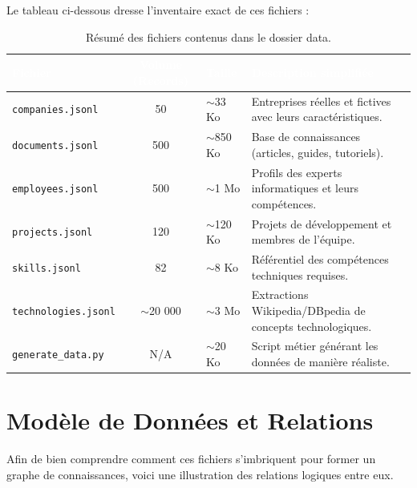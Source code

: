 \documentclass[12pt,a4paper]{article}
\begin{document}
Le tableau ci-dessous dresse l'inventaire exact de ces fichiers :

\begin{table}[h!]
    \centering
    \renewcommand{\arraystretch}{1.5}
    \begin{tabularx}{\textwidth}{>{\columncolor{bglight}}l c l X}
        \toprule
        \rowcolor{primary}
        \textcolor{white}{\textbf{Fichier}} & \textcolor{white}{\textbf{Volume (Records)}} & \textcolor{white}{\textbf{Taille}} & \textcolor{white}{\textbf{Description simplifiée}} \\
        \midrule
        \texttt{companies.jsonl} & 50 & $\sim$33 Ko & Entreprises réelles et fictives avec leurs caractéristiques. \\
        \texttt{documents.jsonl} & 500 & $\sim$850 Ko & Base de connaissances (articles, guides, tutoriels). \\
        \texttt{employees.jsonl} & 500 & $\sim$1 Mo & Profils des experts informatiques et leurs compétences. \\
        \texttt{projects.jsonl} & 120 & $\sim$120 Ko & Projets de développement et membres de l'équipe. \\
        \texttt{skills.jsonl} & 82 & $\sim$8 Ko & Référentiel des compétences techniques requises. \\
        \texttt{technologies.jsonl}& $\sim$20 000 & $\sim$3 Mo & Extractions Wikipedia/DBpedia de concepts technologiques. \\
        \texttt{generate\_data.py} & N/A & $\sim$20 Ko & Script métier générant les données de manière réaliste. \\
        \bottomrule
    \end{tabularx}
    \caption{Résumé des fichiers contenus dans le dossier data.}
\end{table}

\section{Modèle de Données et Relations}

Afin de bien comprendre comment ces fichiers s'imbriquent pour former un graphe de connaissances, voici une illustration des relations logiques entre eux.
\end{document}

